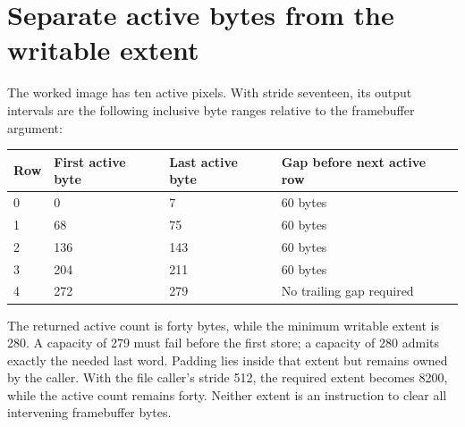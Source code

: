 \section{Separate active bytes from the writable extent}
The worked image has ten active pixels. With stride seventeen, its output intervals
are the following inclusive byte ranges relative to the framebuffer argument:
\begin{longtable}{p{20mm}p{38mm}p{38mm}p{45mm}}
  \toprule Row & First active byte & Last active byte & Gap before next active row \\\midrule
  0            & 0                 & 7                & 60 bytes                   \\
  1            & 68                & 75               & 60 bytes                   \\
  2            & 136               & 143              & 60 bytes                   \\
  3            & 204               & 211              & 60 bytes                   \\
  4            & 272               & 279              & No trailing gap required   \\\bottomrule
\end{longtable}
The returned active count is forty bytes, while the minimum writable extent is
280. A capacity of 279 must fail before the first store; a capacity of 280 admits
exactly the needed last word. Padding lies inside that extent but remains owned by
the caller. With the file caller’s stride 512, the required extent becomes 8200,
while the active count remains forty. Neither extent is an instruction to clear
all intervening framebuffer bytes.
